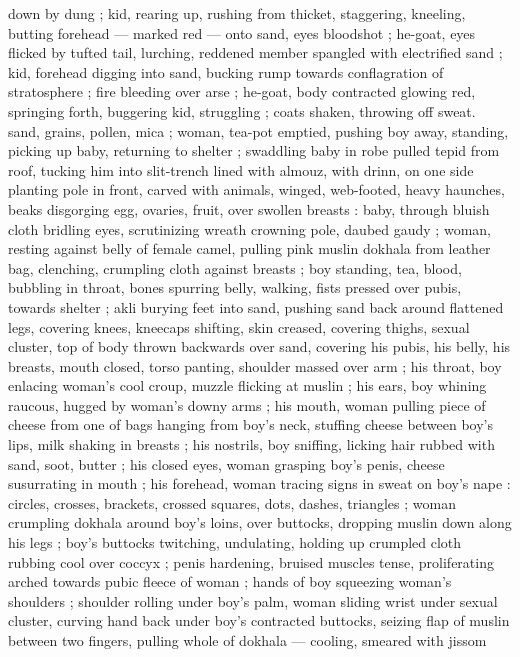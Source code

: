 down by dung ; kid, rearing up, rushing from thicket, staggering, 
kneeling, butting forehead --- marked red --- onto sand, eyes 
bloodshot ; he-goat, eyes flicked by tufted tail, lurching, reddened 
member spangled with electrified sand ; kid, forehead digging into 
sand, bucking rump towards conflagration of stratosphere ; fire 
bleeding over arse ; he-goat, body contracted glowing red, springing 
forth, buggering kid, struggling ; coats shaken, throwing off sweat. 
sand, grains, pollen, mica ; woman, tea-pot emptied, pushing boy 
away, standing, picking up baby, returning to shelter ; swaddling 
baby in robe pulled tepid from roof, tucking him into slit-trench lined 
with almouz, with drinn, on one side planting pole in front, carved 
with animals, winged, web-footed, heavy haunches, beaks disgorging 
egg, ovaries, fruit, over swollen breasts : baby, through bluish cloth 
bridling eyes, scrutinizing wreath crowning pole, daubed gaudy ; 
woman, resting against belly of female camel, pulling pink muslin 
dokhala from leather bag, clenching, crumpling cloth against breasts 
; boy standing, tea, blood, bubbling in throat, bones spurring belly, 
walking, fists pressed over pubis, towards shelter ; akli burying feet 
into sand, pushing sand back around flattened legs, covering knees, 
kneecaps shifting, skin creased, covering thighs, sexual cluster, top 
of body thrown backwards over sand, covering his pubis, his belly, 
his breasts, mouth closed, torso panting, shoulder massed over arm 
; his throat, boy enlacing woman's cool croup, muzzle flicking at 
muslin ; his ears, boy whining raucous, hugged by woman's downy 
arms ; his mouth, woman pulling piece of cheese from one of bags 
hanging from boy's neck, stuffing cheese between boy's lips, milk 
shaking in breasts ; his nostrils, boy sniffing, licking hair rubbed with 
sand, soot, butter ; his closed eyes, woman grasping boy's penis, 
cheese susurrating in mouth ; his forehead, woman tracing signs in 
sweat on boy's nape : circles, crosses, brackets, crossed squares, 
dots, dashes, triangles ; woman crumpling dokhala around boy's 
loins, over buttocks, dropping muslin down along his legs ; boy's 
buttocks twitching, undulating, holding up crumpled cloth rubbing 
cool over coccyx ; penis hardening, bruised muscles tense, 
proliferating arched towards pubic fleece of woman ; hands of boy 
squeezing woman's shoulders ; shoulder rolling under boy's palm, 
woman sliding wrist under sexual cluster, curving hand back under 
boy's contracted buttocks, seizing flap of muslin between two 
fingers, pulling whole of dokhala --- cooling, smeared with jissom 
